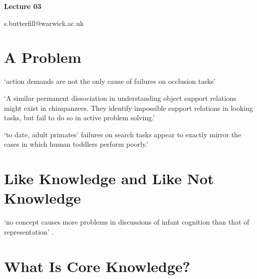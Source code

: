\documentclass[12pt]{extarticle}
\date{}
\makeatletter
\def \ititle {Origins of Mind}
\def \iemail{s.butterfill@warwick.ac.uk}
\makeatother
\begin{document}
\begin{multicols}{3}

\setlength\footnotesep{1em}










\def \ititle {Lecture 03}

\begin{center}

{\Large

\textbf{\ititle}

}



\iemail %

\end{center}



\section{A Problem}

‘action demands are not the only cause of failures on occlusion tasks’
\citep[p.\ 291]{shinskey:2012_disappearing}

‘A similar permanent dissociation in understanding object support relations
            might exist in chimpanzees. They identify impossible support relations in looking tasks,
            but fail to do so in active problem solving.’
\citep{gomez:2005_species}

‘to date, adult primates’ failures on search tasks appear to
            exactly mirror the cases in which human toddlers perform poorly.’
\citep[p.\ 17]{santos:2009_object}



\section{Like Knowledge and Like Not Knowledge}

‘no concept causes more problems in discussions of infant cognition than that of representation’
\citep{Haith:1998aq}.



\section{What Is Core Knowledge?}


\end{multicols}
\end{document}
